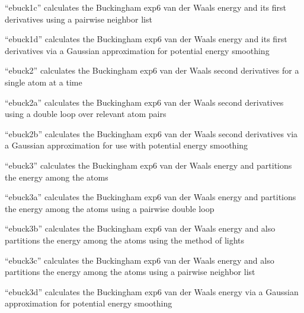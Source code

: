\documentclass[letterpaper,11pt,english]{sphinxmanual}
\begin{document}

“ebuck1c” calculates the Buckingham exp\sphinxhyphen{}6 van der Waals energy
and its first derivatives using a pairwise neighbor list


“ebuck1d” calculates the Buckingham exp\sphinxhyphen{}6 van der Waals energy
and its first derivatives via a Gaussian approximation for
potential energy smoothing


“ebuck2” calculates the Buckingham exp\sphinxhyphen{}6 van der Waals
second derivatives for a single atom at a time


“ebuck2a” calculates the Buckingham exp\sphinxhyphen{}6 van der Waals second
derivatives using a double loop over relevant atom pairs


“ebuck2b” calculates the Buckingham exp\sphinxhyphen{}6 van der Waals second
derivatives via a Gaussian approximation for use with potential
energy smoothing


“ebuck3” calculates the Buckingham exp\sphinxhyphen{}6 van der Waals energy
and partitions the energy among the atoms


“ebuck3a” calculates the Buckingham exp\sphinxhyphen{}6 van der Waals
energy and partitions the energy among the atoms using
a pairwise double loop


“ebuck3b” calculates the Buckingham exp\sphinxhyphen{}6 van der Waals
energy and also partitions the energy among the atoms using
the method of lights


“ebuck3c” calculates the Buckingham exp\sphinxhyphen{}6 van der Waals energy
and also partitions the energy among the atoms using a pairwise
neighbor list


“ebuck3d” calculates the Buckingham exp\sphinxhyphen{}6 van der Waals energy
via a Gaussian approximation for potential energy smoothing
\end{document}
